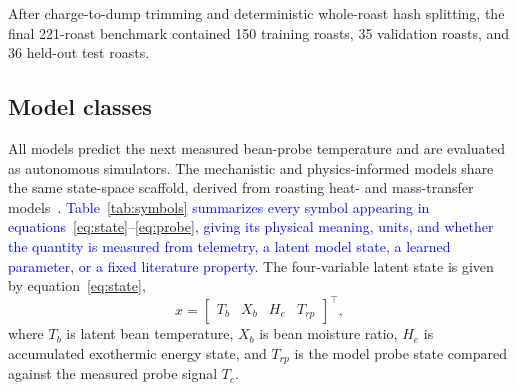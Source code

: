 \documentclass[fleqn,10pt]{wlscirep}
\newcommand{\rev}[1]{\textcolor{blue}{#1}}
\begin{document}
After charge-to-dump trimming and deterministic whole-roast hash splitting, the final 221-roast benchmark contained 150 training roasts, 35 validation roasts, and 36 held-out test roasts.

\subsection*{Model classes}\label{sec:model_classes}

All models predict the next measured bean-probe temperature and are evaluated as autonomous simulators. The mechanistic and physics-informed models share the same state-space scaffold, derived from roasting heat- and mass-transfer models~\cite{schwartzberg2002,vosloo2017,putranto2012,hernandez2007,fabbri2011,fadai2017}. \rev{Table~\ref{tab:symbols} summarizes every symbol appearing in equations~\eqref{eq:state}--\eqref{eq:probe}, giving its physical meaning, units, and whether the quantity is measured from telemetry, a latent model state, a learned parameter, or a fixed literature property.} The four-variable latent state is given by equation~\eqref{eq:state},
\begin{equation}\label{eq:state}
x = \begin{bmatrix} T_b & X_b & H_e & T_{rp} \end{bmatrix}^{\top},
\end{equation}
where $T_b$ is latent bean temperature, $X_b$ is bean moisture ratio, $H_e$ is accumulated exothermic energy state, and $T_{rp}$ is the model probe state compared against the measured probe signal $T_c$.
\end{document}
